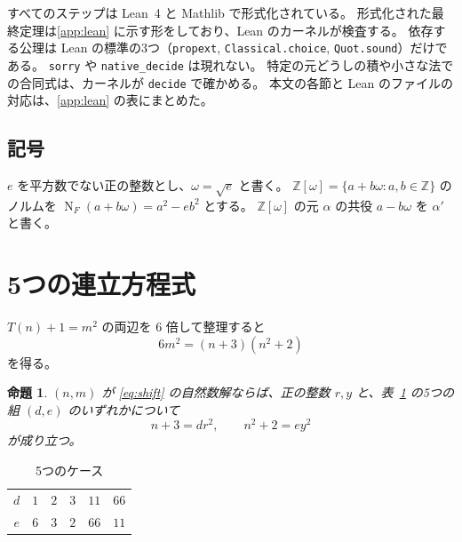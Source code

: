 \documentclass[a4paper,11pt]{ltjsarticle}
\theoremstyle{jplain}
\newtheorem{proposition}[theorem]{命題}
\numberwithin{equation}{section}
\numberwithin{table}{section}
\newcommand{\Z}{\mathbb{Z}}
\newcommand{\NF}{\operatorname{N}_F}
\newcommand{\lean}[1]{\texttt{#1}}
\begin{document}
すべてのステップは Lean~4 と Mathlib で形式化されている。
形式化された最終定理は\ref{app:lean} に示す形をしており、Lean のカーネルが検査する。
依存する公理は Lean の標準の3つ（\lean{propext}, \lean{Classical.choice}, \lean{Quot.sound}）だけである。
\lean{sorry} や \lean{native\_decide} は現れない。
特定の元どうしの積や小さな法での合同式は、カーネルが \lean{decide} で確かめる。
本文の各節と Lean のファイルの対応は、\ref{app:lean} の表にまとめた。

\subsection{記号}

$e$ を平方数でない正の整数とし、$\omega=\sqrt e$ と書く。
$\Z[\omega]=\{a+b\omega : a,b\in\Z\}$ のノルムを $\NF(a+b\omega)=a^2-eb^2$ とする。
$\Z[\omega]$ の元 $\alpha$ の共役 $a-b\omega$ を $\alpha'$ と書く。

\section{5つの連立方程式}\label{sec:branches}

$T(n)+1=m^2$ の両辺を $6$ 倍して整理すると
\begin{equation}\label{eq:shift}
6m^2=(n+3)(n^2+2)
\end{equation}
を得る。

\begin{proposition}\label{prop:branches}
$(n,m)$ が \eqref{eq:shift} の自然数解ならば、正の整数 $r,y$ と、表~\ref{tab:branches} の5つの組 $(d,e)$ のいずれかについて
\begin{equation}\label{eq:pair}
n+3=dr^2,\qquad n^2+2=ey^2
\end{equation}
が成り立つ。
\end{proposition}

\begin{table}[htbp]
\centering
\caption{5つのケース}\label{tab:branches}
\begin{tabular}{c|ccccc}
\toprule
$d$ & $1$ & $2$ & $3$ & $11$ & $66$\\
$e$ & $6$ & $3$ & $2$ & $66$ & $11$\\
\bottomrule
\end{tabular}
\end{table}
\end{document}
